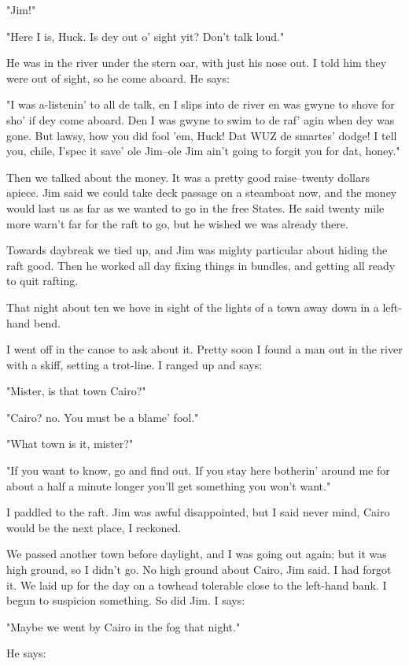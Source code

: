 "Jim!"

"Here I is, Huck.  Is dey out o' sight yit?  Don't talk loud."

He was in the river under the stern oar, with just his nose out.  I told
him they were out of sight, so he come aboard.  He says:

"I was a-listenin' to all de talk, en I slips into de river en was gwyne
to shove for sho' if dey come aboard.  Den I was gwyne to swim to de raf'
agin when dey was gone.  But lawsy, how you did fool 'em, Huck!  Dat WUZ
de smartes' dodge!  I tell you, chile, I'spec it save' ole Jim--ole Jim
ain't going to forgit you for dat, honey."

Then we talked about the money.  It was a pretty good raise--twenty
dollars apiece.  Jim said we could take deck passage on a steamboat now,
and the money would last us as far as we wanted to go in the free States.
He said twenty mile more warn't far for the raft to go, but he wished we
was already there.

Towards daybreak we tied up, and Jim was mighty particular about hiding
the raft good.  Then he worked all day fixing things in bundles, and
getting all ready to quit rafting.

That night about ten we hove in sight of the lights of a town away down
in a left-hand bend.

I went off in the canoe to ask about it.  Pretty soon I found a man out
in the river with a skiff, setting a trot-line.  I ranged up and says:

"Mister, is that town Cairo?"

"Cairo? no.  You must be a blame' fool."

"What town is it, mister?"

"If you want to know, go and find out.  If you stay here botherin' around
me for about a half a minute longer you'll get something you won't want."

I paddled to the raft.  Jim was awful disappointed, but I said never
mind, Cairo would be the next place, I reckoned.

We passed another town before daylight, and I was going out again; but it
was high ground, so I didn't go.  No high ground about Cairo, Jim said.
I had forgot it.  We laid up for the day on a towhead tolerable close to
the left-hand bank.  I begun to suspicion something.  So did Jim.  I
says:

"Maybe we went by Cairo in the fog that night."

He says:

